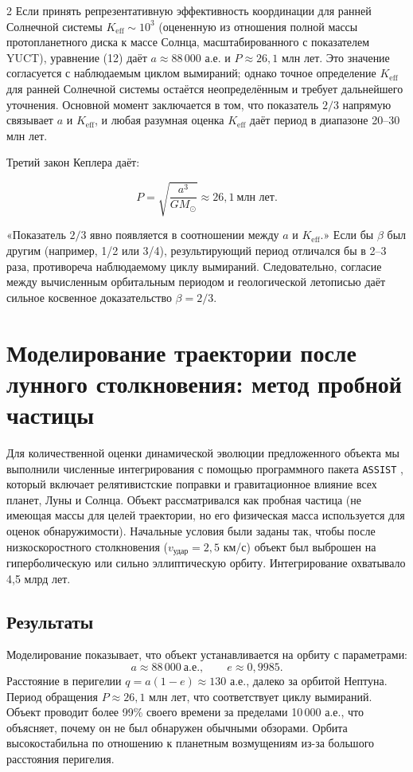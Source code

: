 \documentclass[11pt,a4paper]{article}
\begin{document}
\begin{multicols}{2}
		Если принять репрезентативную эффективность координации для ранней Солнечной системы $K_{\mathrm{eff}} \sim 10^3$ (оцененную из отношения полной массы протопланетного диска к массе Солнца, масштабированного с показателем YUCT), уравнение (12) даёт $a \approx 88\,000$ а.е. и $P \approx 26,1$ млн лет. Это значение согласуется с наблюдаемым циклом вымираний; однако точное определение $K_{\mathrm{eff}}$ для ранней Солнечной системы остаётся неопределённым и требует дальнейшего уточнения. Основной момент заключается в том, что показатель $2/3$ напрямую связывает $a$ и $K_{\mathrm{eff}}$, и любая разумная оценка $K_{\mathrm{eff}}$ даёт период в диапазоне 20–30 млн лет.
		
		Третий закон Кеплера даёт:
		
		\[
		P = \sqrt{\frac{a^3}{GM_{\odot}}} \approx 26,1\ \text{млн лет}.
		\]
		
		«Показатель $2/3$ явно появляется в соотношении между $a$ и $K_{\mathrm{eff}}$.» Если бы $\beta$ был другим (например, 1/2 или 3/4), результирующий период отличался бы в 2–3 раза, противореча наблюдаемому циклу вымираний. Следовательно, согласие между вычисленным орбитальным периодом и геологической летописью даёт сильное косвенное доказательство $\beta = 2/3$.
		
		\section{Моделирование траектории после лунного столкновения: метод пробной частицы}
		
		Для количественной оценки динамической эволюции предложенного объекта мы выполнили численные интегрирования с помощью программного пакета \texttt{ASSIST} \cite{Tamayo2020}, который включает релятивистские поправки и гравитационное влияние всех планет, Луны и Солнца. Объект рассматривался как пробная частица (не имеющая массы для целей траектории, но его физическая масса используется для оценок обнаружимости). Начальные условия были заданы так, чтобы после низкоскоростного столкновения (\(v_{\text{удар}} = 2,5\) км/с) объект был выброшен на гиперболическую или сильно эллиптическую орбиту. Интегрирование охватывало 4,5 млрд лет.
		
		\subsection{Результаты}
		
		Моделирование показывает, что объект устанавливается на орбиту с параметрами:
		\[
		a \approx 88\,000\ \text{а.е.},\qquad e \approx 0,9985.
		\]
		Расстояние в перигелии \(q = a(1-e) \approx 130\) а.е., далеко за орбитой Нептуна. Период обращения \(P \approx 26,1\) млн лет, что соответствует циклу вымираний. Объект проводит более 99\% своего времени за пределами 10\,000 а.е., что объясняет, почему он не был обнаружен обычными обзорами. Орбита высокостабильна по отношению к планетным возмущениям из-за большого расстояния перигелия.
		

\end{multicols}
\end{document}
